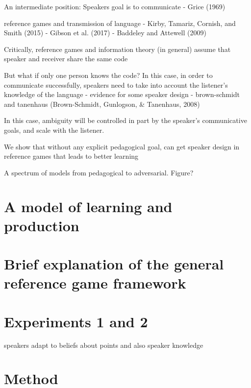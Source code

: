 \documentclass[english,,man,floatsintext]{apa6}
\begin{document}
An intermediate position: Speakers goal is to communicate
- Grice (1969)

reference games and transmission of language
- Kirby, Tamariz, Cornish, and Smith (2015)
- Gibson et al. (2017)
- Baddeley and Attewell (2009)

Critically, reference games and information theory (in general) assume that speaker and receiver share the same code

But what if only one person knows the code? In this case, in order to communicate successfully, speakers need to take into account the listener's knowledge of the language
- evidence for some speaker design
- brown-schmidt and tanenhaus (Brown-Schmidt, Gunlogson, \& Tanenhaus, 2008)

In this case, ambiguity will be controlled in part by the speaker's communicative goals, and scale with the listener.

We show that without any explicit pedagogical goal, can get speaker design in reference games that leads to better learning

A spectrum of models from pedagogical to adversarial. Figure?

\hypertarget{a-model-of-learning-and-production}{%
\section{A model of learning and production}\label{a-model-of-learning-and-production}}

\hypertarget{brief-explanation-of-the-general-reference-game-framework}{%
\section{Brief explanation of the general reference game framework}\label{brief-explanation-of-the-general-reference-game-framework}}

\hypertarget{experiments-1-and-2}{%
\section{Experiments 1 and 2}\label{experiments-1-and-2}}

speakers adapt to beliefs about points and also speaker knowledge

\hypertarget{method}{%
\section{Method}\label{method}}
\end{document}
